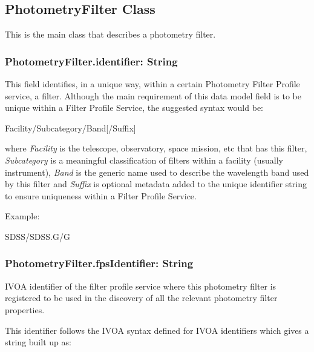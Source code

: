 \documentclass[11pt,a4paper]{ivoa}
\begin{document}
\subsection{PhotometryFilter Class}
This is the main class that describes a photometry filter.
\par

\subsubsection{PhotometryFilter.identifier: String}
This field identifies, in a unique way, within a certain Photometry
Filter Profile service, a filter. Although the main requirement of
this data model field is to be unique within a Filter Profile Service,
the suggested syntax would be:
\par


Facility/Subcategory/Band[/Suffix]
\bigskip


where \textit{Facility} is the telescope, observatory, space mission,
etc that has this filter, \textit{Subcategory} is a meaningful
classification of filters within a facility (usually instrument),
\textit{Band} is the generic name used to describe the wavelength
band used by this filter and \textit{Suffix} is optional metadata added
to the unique identifier string to ensure uniqueness within a Filter
Profile Service.
\par

Example:
\par
SDSS/SDSS.G/G
\bigskip


\subsubsection{PhotometryFilter.fpsIdentifier: String}
IVOA identifier of the filter profile service where this photometry
filter is registered to be used in the discovery of all the relevant
photometry filter properties.
\par

This identifier follows the IVOA syntax defined for IVOA
identifiers \citep{2016ivoa.spec.0523D} which gives a string built up as:
\par
\end{document}
